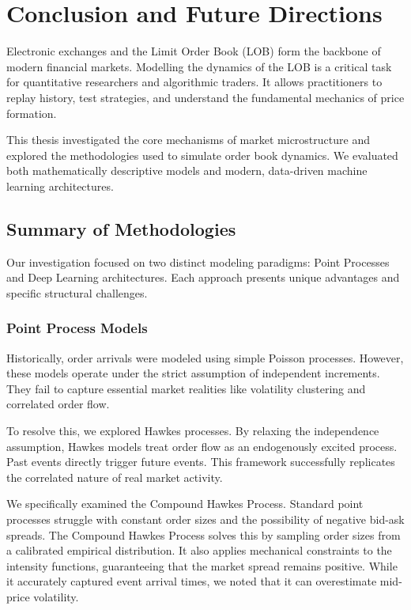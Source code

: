 \chapter{Conclusion and Future Directions}

Electronic exchanges and the Limit Order Book (LOB) form the backbone of modern financial markets. Modelling the dynamics of the LOB is a critical task for quantitative researchers and algorithmic traders. It allows practitioners to replay history, test strategies, and understand the fundamental mechanics of price formation. 

This thesis investigated the core mechanisms of market microstructure and explored the methodologies used to simulate order book dynamics. We evaluated both mathematically descriptive models and modern, data-driven machine learning architectures.

\section{Summary of Methodologies}

Our investigation focused on two distinct modeling paradigms: Point Processes and Deep Learning architectures. Each approach presents unique advantages and specific structural challenges.

\subsection{Point Process Models}
Historically, order arrivals were modeled using simple Poisson processes. However, these models operate under the strict assumption of independent increments. They fail to capture essential market realities like volatility clustering and correlated order flow. 

To resolve this, we explored Hawkes processes. By relaxing the independence assumption, Hawkes models treat order flow as an endogenously excited process. Past events directly trigger future events. This framework successfully replicates the correlated nature of real market activity. 

We specifically examined the Compound Hawkes Process. Standard point processes struggle with constant order sizes and the possibility of negative bid-ask spreads. The Compound Hawkes Process solves this by sampling order sizes from a calibrated empirical distribution. It also applies mechanical constraints to the intensity functions, guaranteeing that the market spread remains positive. While it accurately captured event arrival times, we noted that it can overestimate mid-price volatility.

